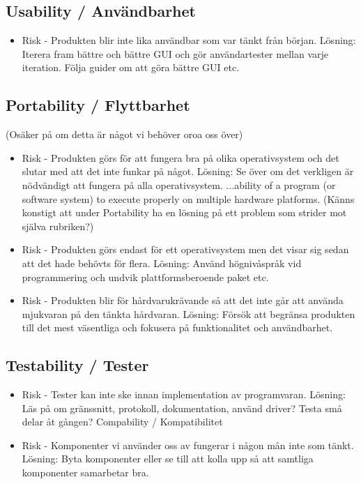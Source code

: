 \subsection{Usability / Användbarhet}
\begin{itemize}
\item Risk - Produkten blir inte lika användbar som var tänkt från början.
Lösning: Iterera fram bättre och bättre GUI och gör användartester mellan varje iteration. Följa guider om att göra bättre GUI etc.
\end{itemize}

\subsection{Portability / Flyttbarhet}
(Osäker på om detta är något vi behöver oroa oss över)
\begin{itemize}
\item Risk - Produkten görs för att fungera bra på olika operativsystem och det slutar med att det inte funkar på något.
Lösning: Se över om det verkligen är nödvändigt att fungera på alla operativsystem.
...ability of a program (or software system) to execute properly on multiple hardware platforms.
(Känns konstigt att under Portability ha en lösning på ett problem som strider mot själva rubriken?)
\item Risk - Produkten görs endast för ett operativsystem men det visar sig sedan att det hade behövts för flera.
Lösning: Använd högnivåspråk vid programmering och undvik plattformsberoende paket etc.
\item Risk - Produkten blir för hårdvarukrävande så att det inte går att använda mjukvaran på den tänkta hårdvaran.
Lösning: Försök att begränsa produkten till det mest väsentliga och fokusera på funktionalitet och användbarhet.
\end{itemize}

\subsection{Testability / Tester}
\begin{itemize}
\item Risk - Tester kan inte ske innan implementation av programvaran.
Lösning: Läs på om gränssnitt, protokoll, dokumentation, använd driver? Testa små delar åt gången?
Compability / Kompatibilitet

\item Risk - Komponenter vi använder oss av fungerar i någon mån inte som tänkt.
Lösning: Byta komponenter eller se till att kolla upp så att samtliga komponenter samarbetar bra.
\end{itemize}


